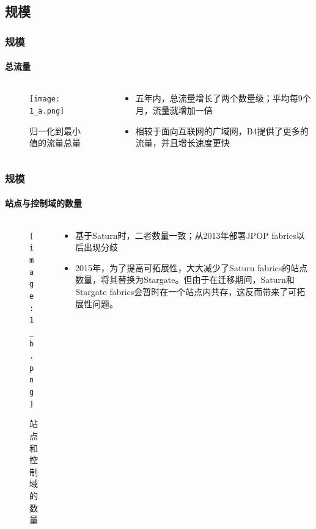 \subsection{规模}
\begin{frame}
    \frametitle{规模}
    \framesubtitle{总流量}
    \begin{columns}
        \begin{column}{0.4\textwidth}
        \begin{figure}
            \centering
            \texttt{[image: 1\_a.png]}
            \caption{归一化到最小值的流量总量}
        \end{figure}
        \end{column}
        
        \begin{column}{0.6\textwidth}
            \begin{itemize}
                \item 五年内，总流量增长了两个数量级；平均每9个月，流量就增加一倍
                \item 相较于面向互联网的广域网，B4提供了更多的流量，并且增长速度更快
            \end{itemize}
        \end{column}
    \end{columns}
\end{frame}

\begin{frame}
    \frametitle{规模}
    \framesubtitle{站点与控制域的数量}
    \begin{columns}
        \begin{column}{0.4\textwidth}
        \begin{figure}
            \centering
            \texttt{[image: 1\_b.png]}
            \caption{站点和控制域的数量}
        \end{figure}
        \end{column}
        
        \begin{column}{0.6\textwidth}
            \begin{itemize}
                \item 基于Saturn时，二者数量一致；从2013年部署JPOP fabrics以后出现分歧
                \item 2015年，为了提高可拓展性，大大减少了Saturn fabrics的站点数量，将其替换为Stargate。但由于在迁移期间，Saturn和Stargate fabrics会暂时在一个站点内共存，这反而带来了可拓展性问题。
            \end{itemize}
        \end{column}
    \end{columns}
\end{frame}

